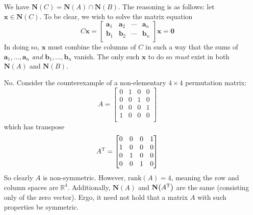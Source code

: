 \documentclass[a4paper]{article}
\begin{document}

We have \(\textbf{N}\!\left( C \right) = \textbf{N}\!\left( A \right) \cap \textbf{N}\!\left( B \right) \). The reasoning is as follows: let \(\bm{x} \in \textbf{N} \!\left( C \right) \). To be clear, we wish to solve the matrix equation
\[
	C \bm{x} = 
	\begin{bmatrix}
		\bm{a}_{1} & \bm{a}_{2} & \cdots  & \bm{a}_{n} \\
		\bm{b}_{1} & \bm{b}_{2} & \cdots  & \bm{b}_{n} \\
	\end{bmatrix}
	\bm{x} = \bm{0}
\]
In doing so, \(\bm{x}\) must combine the columns of \(C\) in such a way that the sums of \(\bm{a}_{1}, \ldots, \bm{a}_{n}\) \textit{and} \(\bm{b}_{1}, \ldots, \bm{b}_{n}\) vanish. The only such \(\bm{x}\) to do so \textit{must} exist in both \(\textbf{N}\!\left( A \right) \) and \(\textbf{N}\!\left( B \right) \).

\vspace{12pt}


No. Consider the counterexample of a non-elementary \(4 \times 4\) permutation matrix:
\[
	A =
	\begin{bmatrix}
		0 & 1 & 0 & 0 \\
		0 & 0 & 1 & 0 \\
		0 & 0 & 0 & 1 \\
		1 & 0 & 0 & 0 \\
	\end{bmatrix}
\]
which has transpose
\[
	A^{\textsc{T}} =
	\begin{bmatrix}
		0 & 0 & 0 & 1 \\
		1 & 0 & 0 & 0 \\
		0 & 1 & 0 & 0 \\
		0 & 0 & 1 & 0 \\
	\end{bmatrix}
\]
So clearly \(A\) is non-symmetric. However, \(\text{rank}\!\left( A \right) = 4\), meaning the row and column spaces are \(\mathbb{R}^{4}\). Additionally, \(\textbf{N}\!\left( A \right) \) and \(\textbf{N}\!\left( A^{\textsc{T}} \right) \) are the same (consisting only of the zero vector). Ergo, it need not hold that a matrix \(A\) with such properties be symmetric.
\end{document}
